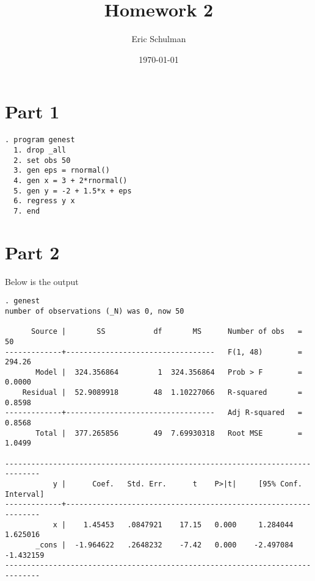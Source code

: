 \documentclass{article}
\title{Homework 2}
\author{Eric Schulman}
\date{\today}
\begin{document}
\maketitle

\section{Part 1}

\begin{lstlisting}
. program genest
  1. drop _all
  2. set obs 50
  3. gen eps = rnormal()
  4. gen x = 3 + 2*rnormal()
  5. gen y = -2 + 1.5*x + eps
  6. regress y x
  7. end

\end{lstlisting}


\section{Part 2}

Below is the output

\begin{lstlisting}
. genest
number of observations (_N) was 0, now 50

      Source |       SS           df       MS      Number of obs   =        50
-------------+----------------------------------   F(1, 48)        =    294.26
       Model |  324.356864         1  324.356864   Prob > F        =    0.0000
    Residual |  52.9089918        48  1.10227066   R-squared       =    0.8598
-------------+----------------------------------   Adj R-squared   =    0.8568
       Total |  377.265856        49  7.69930318   Root MSE        =    1.0499

------------------------------------------------------------------------------
           y |      Coef.   Std. Err.      t    P>|t|     [95% Conf. Interval]
-------------+----------------------------------------------------------------
           x |    1.45453   .0847921    17.15   0.000     1.284044    1.625016
       _cons |  -1.964622   .2648232    -7.42   0.000    -2.497084   -1.432159
------------------------------------------------------------------------------

\end{lstlisting}
\end{document}
